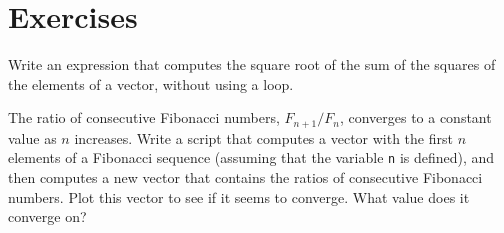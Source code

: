 \section{Exercises}

\begin{ex}
Write an expression that computes the square root of the sum of the squares of the elements of a vector, without using a loop.

\end{ex}

\begin{ex}
\label{fibratio}

The ratio of consecutive Fibonacci numbers, $F_{n+1}/F_{n}$, converges
to a constant value as $n$ increases.  Write a script that computes
a vector with the first $n$ elements of a Fibonacci sequence (assuming
that the variable {\tt n} is defined), and then computes a new
vector that contains the ratios of consecutive Fibonacci numbers.
Plot this vector to see if it seems to converge.  What value does
it converge on?


\end{ex}

